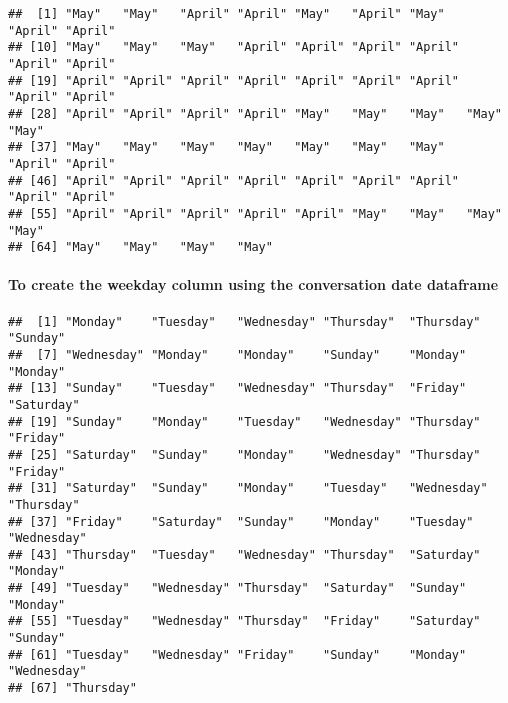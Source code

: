 \documentclass[
]{article}
\newenvironment{Shaded}{\begin{snugshade}}{\end{snugshade}}
\newcommand{\FunctionTok}[1]{\textcolor[rgb]{0.00,0.00,0.00}{#1}}
\newcommand{\NormalTok}[1]{#1}
\newcommand{\OtherTok}[1]{\textcolor[rgb]{0.56,0.35,0.01}{#1}}
\newcommand{\SpecialCharTok}[1]{\textcolor[rgb]{0.00,0.00,0.00}{#1}}
\newcommand{\StringTok}[1]{\textcolor[rgb]{0.31,0.60,0.02}{#1}}
\begin{document}
\begin{verbatim}
##  [1] "May"   "May"   "April" "April" "May"   "April" "May"   "April" "April"
## [10] "May"   "May"   "May"   "April" "April" "April" "April" "April" "April"
## [19] "April" "April" "April" "April" "April" "April" "April" "April" "April"
## [28] "April" "April" "April" "April" "May"   "May"   "May"   "May"   "May"  
## [37] "May"   "May"   "May"   "May"   "May"   "May"   "May"   "April" "April"
## [46] "April" "April" "April" "April" "April" "April" "April" "April" "April"
## [55] "April" "April" "April" "April" "April" "May"   "May"   "May"   "May"  
## [64] "May"   "May"   "May"   "May"
\end{verbatim}

\hypertarget{to-create-the-weekday-column-using-the-conversation-date-dataframe-2}{%
\paragraph{To create the weekday column using the conversation date
dataframe}\label{to-create-the-weekday-column-using-the-conversation-date-dataframe-2}}

\begin{Shaded}
\end{Shaded}

\begin{verbatim}
##  [1] "Monday"    "Tuesday"   "Wednesday" "Thursday"  "Thursday"  "Sunday"   
##  [7] "Wednesday" "Monday"    "Monday"    "Sunday"    "Monday"    "Monday"   
## [13] "Sunday"    "Tuesday"   "Wednesday" "Thursday"  "Friday"    "Saturday" 
## [19] "Sunday"    "Monday"    "Tuesday"   "Wednesday" "Thursday"  "Friday"   
## [25] "Saturday"  "Sunday"    "Monday"    "Wednesday" "Thursday"  "Friday"   
## [31] "Saturday"  "Sunday"    "Monday"    "Tuesday"   "Wednesday" "Thursday" 
## [37] "Friday"    "Saturday"  "Sunday"    "Monday"    "Tuesday"   "Wednesday"
## [43] "Thursday"  "Tuesday"   "Wednesday" "Thursday"  "Saturday"  "Monday"   
## [49] "Tuesday"   "Wednesday" "Thursday"  "Saturday"  "Sunday"    "Monday"   
## [55] "Tuesday"   "Wednesday" "Thursday"  "Friday"    "Saturday"  "Sunday"   
## [61] "Tuesday"   "Wednesday" "Friday"    "Sunday"    "Monday"    "Wednesday"
## [67] "Thursday"
\end{verbatim}
\end{document}
